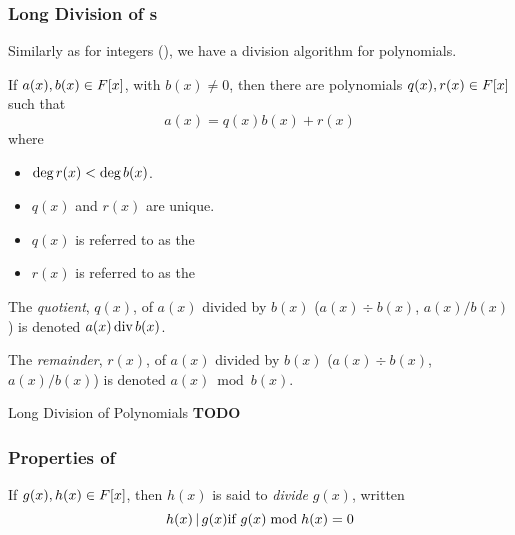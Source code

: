 \subsubsection{Long Division of s}\label{subsubsec:Polynomial_Long_Division}
Similarly as for integers (), we have a division algorithm for polynomials.
\begin{definition}\label{def:Polynomial_Long_Division}
  If $a(x), b(x) \in F[x]$, with $b(x) \neq 0$, then there are polynomials $q(x), r(x) \in F[x]$ such that
  \begin{equation}\label{eq:Polynomials_Long_Division}
    a(x) = q(x) b(x) + r(x)
  \end{equation}
  where
  \begin{itemize}[noitemsep]
  \item $\operatorname{\text{deg}} r(x) < \operatorname{\text{deg}} b(x)$.
  \item $q(x)$ and $r(x)$ are unique.
  \item $q(x)$ is referred to as the 
  \item $r(x)$ is referred to as the 
  \end{itemize}
\end{definition}

\begin{definition}\label{def:Polynomial_Quotient}
  The \emph{ quotient}, $q(x)$, of $a(x)$ divided by $b(x)$ ($a(x) \div b(x)$, $a(x) / b(x)$) is denoted $a(x) \operatorname{\text{div}} b(x)$.
\end{definition}

\begin{definition}\label{def:Polynomial_Remainder}
  The \emph{ remainder}, $r(x)$, of $a(x)$ divided by $b(x)$ ($a(x) \div b(x)$, $a(x) / b(x)$) is denoted $a(x) \bmod b(x)$.
\end{definition}

\begin{example}[Lecture 3]{Long Division of Polynomials}
  \textbf{TODO}
\end{example}

\subsubsection{Properties of }\label{subsubsec:Polynomial_Ring_Properties}
\begin{definition}[Divide]\label{def:Polynomial_Ring_Properties-Divide}
  If $g(x), h(x) \in F[x]$, then $h(x)$ is said to \emph{divide} $g(x)$, written
  \begin{equation}\label{eq:Polynomial_Ring_Properties-Divide}
    h(x) \operatorname{\vert} g(x) \text{if } g(x) \bmod h(x) = 0
  \end{equation}
\end{definition}

